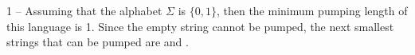1 -- Assuming that the alphabet $\Sigma$ is $\{\text{0},\text{1}\}$, then the minimum pumping length of this language is 1. Since the empty string cannot be pumped, the next smallest strings that can be pumped are  and .